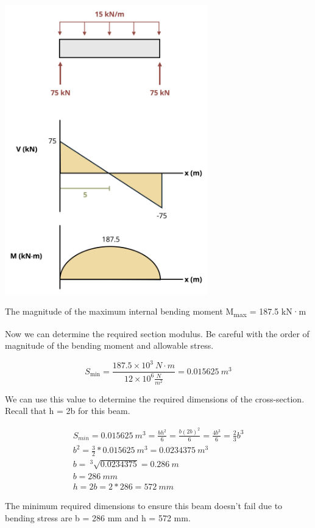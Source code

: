 \documentclass[
  letterpaper,
  DIV=11,
  numbers=noendperiod]{scrreprt}
\begin{document}
\begin{tcolorbox}
\begin{tcolorbox}
\begin{center}
\includegraphics[width=3.45833in,height=\textheight]{images/CH9 PNGs/Example 9.4 part 2.png}
\end{center}

The magnitude of the maximum internal bending moment
\textbar M\textsubscript{max}\textbar{} = 187.5 kN·m

Now we can determine the required section modulus. Be careful with the
order of magnitude of the bending moment and allowable stress.

\[
S_\text{min}=\frac{187.5\times10^3{~N}\cdot{m}}{12\times10^6\frac{N}{m^2}}=0.015625{~m}^3
\]

We can use this value to determine the required dimensions of the
cross-section. Recall that h = 2b for this beam.

\[
\begin{gathered}
S_{min}=0.015625{~m^3}=\frac{b h^2}{6}=\frac{b(2 b)^2}{6}=\frac{4 b^3}{6}=\frac{2}{3} b^3 \\
b^2=\frac{3}{2} * 0.015625{~m^3}=0.0234375{~m^3} \\
b=~^3\sqrt{0.0234375}=0.286{~m} \\
b=286{~mm} \\
h=2b=2 * 286=572{~mm}
\end{gathered}
\]

The minimum required dimensions to ensure this beam doesn't fail due to
bending stress are b = 286 mm and h = 572 mm.

\end{tcolorbox}

\end{tcolorbox}
\end{document}
